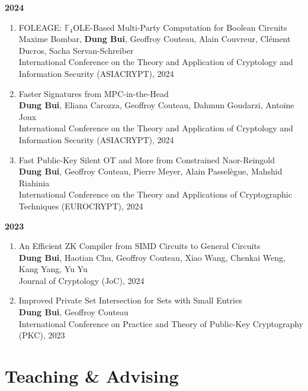 \documentclass[11pt]{article}
\begin{document}
\smallskip
\textbf{2024}
\begin{enumerate}
      \item FOLEAGE: $\mathbb{F}_4$OLE-Based Multi-Party Computation for Boolean Circuits\\
            Maxime Bombar, \textbf{Dung Bui}, Geoffroy Couteau, Alain Couvreur, Cl\'ement Ducros, Sacha Servan-Schreiber\\
            International Conference on the Theory and Application of Cryptology and Information Security (ASIACRYPT), 2024
      \item Faster Signatures from MPC-in-the-Head\\
            \textbf{Dung Bui}, Eliana Carozza, Geoffroy Couteau, Dahmun Goudarzi, Antoine Joux\\
            International Conference on the Theory and Application of Cryptology and Information Security (ASIACRYPT), 2024
      \item Fast Public-Key Silent OT and More from Constrained Naor-Reingold\\
            \textbf{Dung Bui}, Geoffroy Couteau, Pierre Meyer, Alain Passel\`egue, Mahshid Riahinia\\
            International Conference on the Theory and Applications of Cryptographic Techniques (EUROCRYPT), 2024
\end{enumerate}

\smallskip
\textbf{2023}
\begin{enumerate}
      \item An Efficient ZK Compiler from SIMD Circuits to General Circuits\\
            \textbf{Dung Bui}, Haotian Chu, Geoffroy Couteau, Xiao Wang, Chenkai Weng, Kang Yang, Yu Yu\\
            Journal of Cryptology (JoC), 2024
      \item Improved Private Set Intersection for Sets with Small Entries\\
            \textbf{Dung Bui}, Geoffroy Couteau\\
            International Conference on Practice and Theory of Public-Key Cryptography (PKC), 2023
\end{enumerate}

\section{Teaching \& Advising}
\end{document}
